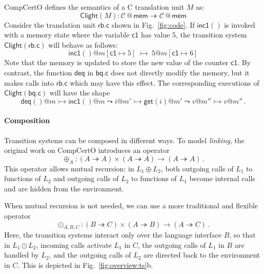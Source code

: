 \documentclass[acmsmall,screen,review,anonymous]{acmart}
\newcommand{\kw}[1]{\ensuremath{ \mathsf{#1} }}
\begin{document}
\begin{example} \label{ex:clightsem} %
CompCertO defines
the semantics of a C translation unit $M$
as:
\[
  \kw{Clight}(M) :
    \mathcal{C} \mathbin@ \kw{mem} \twoheadrightarrow
    \mathcal{C} \mathbin@ \kw{mem}
\]
%
Consider the translation unit $\kw{rb.c}$ shown in Fig.~\ref{fig:code}.
If $\kw{inc1}()$ is invoked
with a memory state where the variable $\kw{c1}$ has value $5$,
the transition system $\kw{Clight}(\kw{rb.c})$ will behave as follows:
\[
  \kw{inc1}()@m[\kw{c1} \mapsto 5]
  \: \rightarrowtail \:
  5@m[\kw{c1} \mapsto 6]
\]
Note that the memory is updated to store the new value of the counter $\kw{c1}$.
By contrast, the function $\kw{deq}$ in $\kw{bq.c}$
does not directly modify the memory,
but it makes calls into $\kw{rb.c}$ which may have this effect.
The corresponding executions of $\kw{Clight}(\kw{bq.c})$
will have the shape
\[
  \kw{deq}()@m
  \rightarrowtail
  \kw{inc1}()@m \leadsto i@m'
  \rightarrowtail
  \kw{get}(i)@m' \leadsto v@m''
  \rightarrowtail
  v@m''
  \,.
\]
\end{example}


\paragraph{Composition} %

Transition systems can be composed in different ways.
To model \emph{linking}, the original work on CompCertO introduces an operator
\[
  {\oplus}_A : (A \twoheadrightarrow A) \times (A \twoheadrightarrow A)
  \rightarrow (A \twoheadrightarrow A)
  \,.
\]
This operator allows mutual recursion:
in $L_1 \oplus L_2$, both
outgoing calls of $L_1$ to functions of $L_2$ and
outgoing calls of $L_2$ to functions of $L_1$
become internal calls and are hidden from the environment.

When mutual recursion is not needed,
we can use a more traditional and flexible operator
\[
  {\odot}_{A,B,C} :
    (B \twoheadrightarrow C) \times
    (A \twoheadrightarrow B) \rightarrow
    (A \twoheadrightarrow C)
  \,.
\]
Here,
the transition systems interact only over
the language interface $B$,
so that in $L_1 \odot L_2$,
incoming calls activate $L_1$ in $C$,
the outgoing calls of $L_1$ in $B$ are handled by $L_2$, and
the outgoing calls of $L_2$
are directed back to the environment in $C$.
This is depicted in Fig.~\ref{fig:overview:ts}b.
\end{document}
